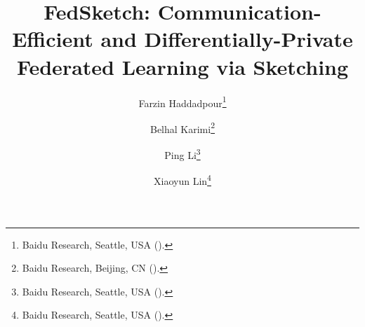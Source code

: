 

\usepackage{lipsum}
\usepackage{amsfonts}
\usepackage{graphicx}
\usepackage{epstopdf}
\usepackage{algorithmic}
\ifpdf
\else
\fi

\newcommand{\creflastconjunction}{, and~}



\title{FedSketch: Communication-Efficient and Differentially-Private Federated Learning via Sketching}

\author{Farzin Haddadpour\thanks{Baidu Research, Seattle, USA 
  ().}
\and Belhal Karimi\thanks{Baidu Research, Beijing, CN 
  ().}
   \and Ping Li\thanks{Baidu Research, Seattle, USA 
  ().}
\and Xiaoyun Lin\thanks{Baidu Research, Seattle, USA 
  ().}
  }

\usepackage{amsopn}
\DeclareMathOperator{\diag}{diag}


